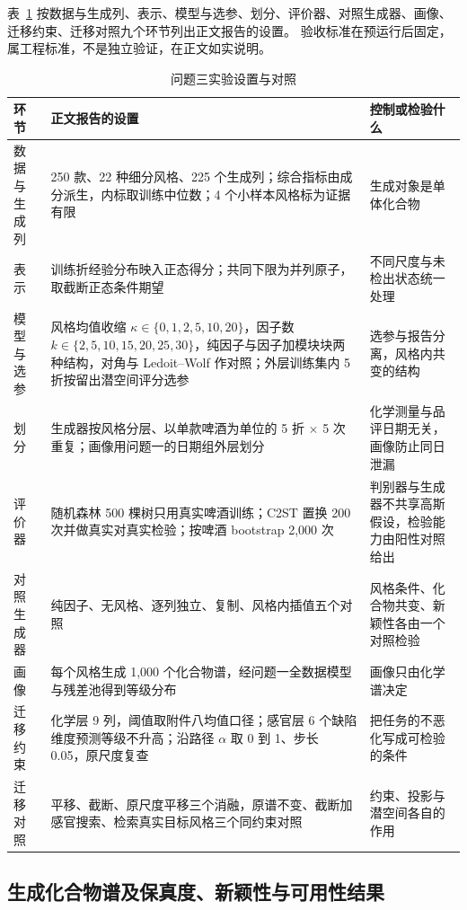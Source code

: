 表~\ref{tab:q3-setup} 按数据与生成列、表示、模型与选参、划分、评价器、对照生成器、画像、迁移约束、迁移对照九个环节列出正文报告的设置。
验收标准在预运行后固定，属工程标准，不是独立验证，在正文如实说明。

\begin{table}[H]
\centering\small
\caption{问题三实验设置与对照}
\label{tab:q3-setup}
\begin{tabular}{p{3.0cm}p{5.4cm}p{4.2cm}}
\toprule
环节 & 正文报告的设置 & 控制或检验什么 \\
\midrule
数据与生成列 & 250 款、22 种细分风格、225 个生成列；综合指标由成分派生，内标取训练中位数；4 个小样本风格标为证据有限 & 生成对象是单体化合物 \\
\addlinespace
表示 & 训练折经验分布映入正态得分；共同下限为并列原子，取截断正态条件期望 & 不同尺度与未检出状态统一处理 \\
\addlinespace
模型与选参 & 风格均值收缩 $\kappa\in\{0,1,2,5,10,20\}$，因子数 $k\in\{2,5,10,15,20,25,30\}$，纯因子与因子加模块块两种结构，对角与 Ledoit--Wolf 作对照；外层训练集内 5 折按留出潜空间评分选参 & 选参与报告分离，风格内共变的结构 \\
\addlinespace
划分 & 生成器按风格分层、以单款啤酒为单位的 5 折 $\times$ 5 次重复；画像用问题一的日期组外层划分 & 化学测量与品评日期无关，画像防止同日泄漏 \\
\addlinespace
评价器 & 随机森林 500 棵树只用真实啤酒训练；C2ST 置换 200 次并做真实对真实检验；按啤酒 bootstrap 2,000 次 & 判别器与生成器不共享高斯假设，检验能力由阳性对照给出 \\
\addlinespace
对照生成器 & 纯因子、无风格、逐列独立、复制、风格内插值五个对照 & 风格条件、化合物共变、新颖性各由一个对照检验 \\
\addlinespace
画像 & 每个风格生成 1,000 个化合物谱，经问题一全数据模型与残差池得到等级分布 & 画像只由化学谱决定 \\
\addlinespace
迁移约束 & 化学层 9 列，阈值取附件八均值口径；感官层 6 个缺陷维度预测等级不升高；沿路径 $\alpha$ 取 0 到 1、步长 0.05，原尺度复查 & 把任务的不恶化写成可检验的条件 \\
\addlinespace
迁移对照 & 平移、截断、原尺度平移三个消融，原谱不变、截断加感官搜索、检索真实目标风格三个同约束对照 & 约束、投影与潜空间各自的作用 \\
\bottomrule
\end{tabular}
\end{table}

\subsection{生成化合物谱及保真度、新颖性与可用性结果}

